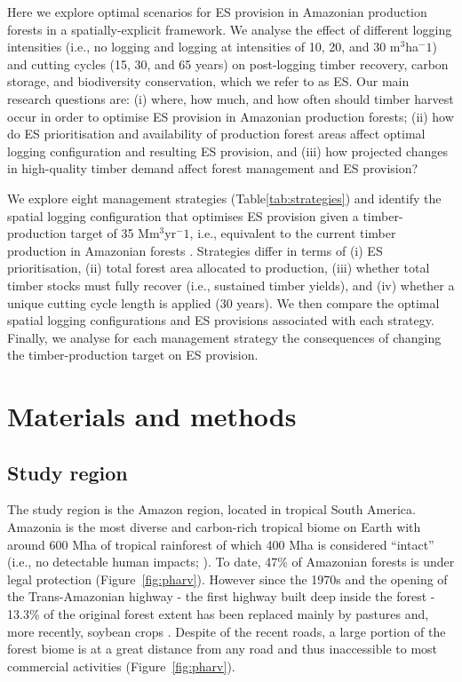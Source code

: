 \documentclass{article}
\begin{document}
Here we explore optimal scenarios for ES provision in Amazonian production forests in a spatially-explicit framework. We analyse the effect of different logging intensities (i.e., no logging and logging at intensities of 10, 20, and 30 m$^3$ha$^-1$) and cutting cycles (15, 30, and 65 years) on post-logging timber recovery, carbon storage, and biodiversity conservation, which we refer to as ES. Our main research questions are: (i) where, how much, and how often should timber harvest occur in order to optimise ES provision in Amazonian production forests; (ii) how do ES prioritisation and availability of production forest areas affect optimal logging configuration and resulting ES provision, and (iii) how projected changes in high-quality timber demand affect forest management and ES provision? 

We explore eight management strategies (Table\ref{tab:strategies}) and identify the spatial logging configuration that optimises ES provision given a timber-production target of 35 Mm$^3$yr$^-1$, i.e., equivalent to the current timber production in Amazonian forests \cite{Lentini2005}. Strategies differ in terms of (i) ES prioritisation, (ii) total forest area allocated to production, (iii) whether total timber stocks must fully recover (i.e., sustained timber yields), and (iv) whether a unique cutting cycle length is applied (30 years). We then compare the optimal spatial logging configurations and ES provisions associated with each strategy. Finally, we analyse for each management strategy the consequences of changing the timber-production target on ES provision.

\section{Materials and methods}

\subsection{Study region}

The study region is the Amazon region, located in tropical South America. Amazonia is the most diverse and carbon-rich tropical biome on Earth \cite{Avitabile2016,Pimm2014} with around 600 Mha of tropical rainforest of which 400 Mha is considered “intact” (i.e., no detectable human impacts; \cite{Potapov2017}). To date, 47\% of Amazonian forests is under legal protection \cite{WDPA2016} (Figure~\ref{fig:pharv}). However since the 1970s and the opening of the Trans-Amazonian highway - the first highway built deep inside the forest - 13.3\% of the original forest extent has been replaced mainly by pastures and, more recently, soybean crops \cite{Fearnside2017}. Despite of the recent roads, a large portion of the forest biome is at a great distance from any road and thus inaccessible to most commercial activities (Figure~\ref{fig:pharv}).
\end{document}
